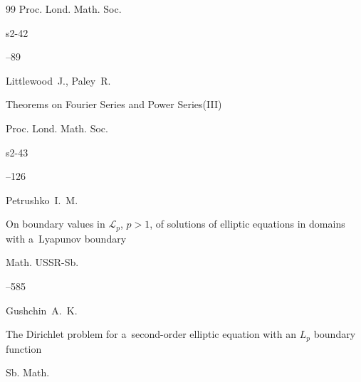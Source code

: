 \begin{thebibliography}{99}
\jour Proc. Lond. Math. Soc.


\vol s2-42


--89






\by Littlewood~J., Paley~R.

\paper Theorems on Fourier Series and Power Series(III)

\jour Proc. Lond. Math. Soc.


\vol s2-43


--126







\by Petrushko~I.~M.

\paper On boundary values in $\mathscr L_p$, $p>1$, of solutions of elliptic equations in domains with a~Lyapunov boundary

\jour Math. USSR-Sb.




--585







\by Gushchin~A.~K.

\paper The Dirichlet problem for a~second-order elliptic equation with an $L_p$ boundary function

\jour Sb. Math.




\end{thebibliography}
